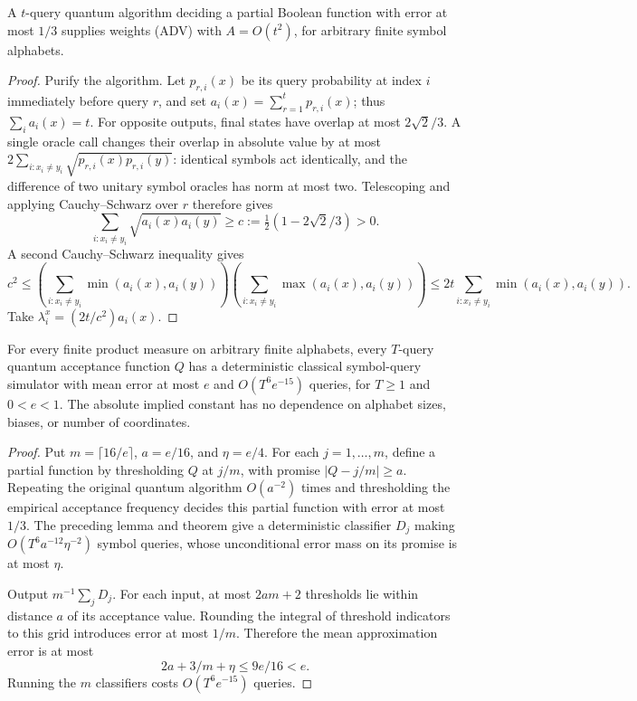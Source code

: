 \begin{lemma}
\label{lem:resolution-symbol-adversary}
A \(t\)-query quantum algorithm deciding a partial Boolean function
with error at most \(1/3\) supplies weights (ADV) with \(A=O(t^2)\),
for arbitrary finite symbol alphabets.
\end{lemma}

\begin{proof}
Purify the algorithm. Let \(p_{r,i}(x)\) be its query probability
at index \(i\) immediately before query \(r\), and set
\(a_i(x)=\sum_{r=1}^t p_{r,i}(x)\); thus \(\sum_i a_i(x)=t\).
For opposite outputs, final states have overlap at most
\(2\sqrt2/3\). A single oracle call changes their overlap in
absolute value by at most
\(2\sum_{i:x_i\ne y_i}\sqrt{p_{r,i}(x)p_{r,i}(y)}\): identical
symbols act identically, and the difference of two unitary symbol
oracles has norm at most two. Telescoping and applying Cauchy--Schwarz
over \(r\) therefore gives
\[
 \sum_{i:x_i\ne y_i}\sqrt{a_i(x)a_i(y)}\ge
 c:=\tfrac12(1-2\sqrt2/3)>0.
\]
A second Cauchy--Schwarz inequality gives
\[
 c^2\le
 \left(\sum_{i:x_i\ne y_i}\min(a_i(x),a_i(y))\right)
 \left(\sum_{i:x_i\ne y_i}\max(a_i(x),a_i(y))\right)
 \le2t\sum_{i:x_i\ne y_i}\min(a_i(x),a_i(y)).
\]
Take \(\lambda_i^x=(2t/c^2)a_i(x)\).
\end{proof}

\begin{corollary}
\label{cor:resolution-product-alphabet-aa}
For every finite product measure on arbitrary finite alphabets,
every \(T\)-query quantum acceptance function \(Q\) has a
deterministic classical symbol-query simulator with mean error at
most \(e\) and \(O(T^6e^{-15})\) queries, for
\(T\ge1\) and \(0<e<1\). The absolute implied constant has no
dependence on alphabet sizes, biases, or number of coordinates.
\end{corollary}

\begin{proof}
Put \(m=\lceil16/e\rceil\), \(a=e/16\), and \(\eta=e/4\).
For each \(j=1,\ldots,m\), define a partial function by thresholding
\(Q\) at \(j/m\), with promise \(|Q-j/m|\ge a\).
Repeating the original quantum algorithm \(O(a^{-2})\) times and
thresholding the empirical acceptance frequency decides this partial
function with error at most \(1/3\). The preceding lemma and theorem
give a deterministic classifier \(D_j\) making
\(O(T^6a^{-12}\eta^{-2})\) symbol queries, whose unconditional
error mass on its promise is at most \(\eta\).

Output \(m^{-1}\sum_jD_j\). For each input, at most \(2am+2\)
thresholds lie within distance \(a\) of its acceptance value.
Rounding the integral of threshold indicators to this grid introduces
error at most \(1/m\). Therefore the mean approximation error is
at most
\[
 2a+3/m+\eta\le9e/16<e.
\]
Running the \(m\) classifiers costs \(O(T^6e^{-15})\) queries.
\end{proof}

